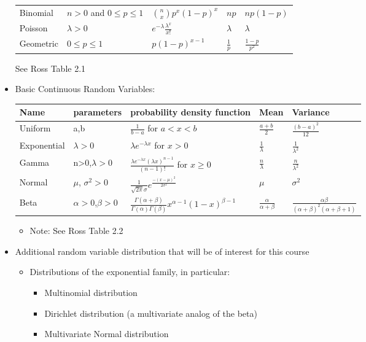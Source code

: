 \documentclass[10pt,containsverbatim,paralist]{article}
\begin{document}
\begin{itemize}
\begin{center}
\begin{tabular}{lllll}
\hline
Binomial & $n>0$ and $0\leq p\leq 1$ & $\binom{n}{x} p^x (1-p)^x$ & $np$ & $np(1-p)$\\
Poisson & $\lambda >0$ & $e^{-\lambda}\frac{\lambda^x}{x!}$ & $\lambda$ & $\lambda$\\
Geometric & $0\leq p\leq 1$ & $p(1-p)^{x-1}$ & $\frac{1}{p}$ & $\frac{1-p}{p^2}$\\
\hline
\end{tabular}
\end{center}
See Ross Table 2.1
\item Basic Continuous Random Variables:
\label{sec-1-1-4-3}
\begin{center}
\begin{tabular}{lllll}
\hline
Name & parameters & probability density function & Mean & Variance\\
\hline
Uniform & a,b & $\frac{1}{b-a}$ for $a<x<b$ & $\frac{a+b}{2}$ & $\frac{(b-a)^2}{12}$\\
Exponential & $\lambda>0$ & $\lambda e^{-\lambda x}$ for $x>0$ & $\frac{1}{\lambda}$ & $\frac{1}{\lambda^2}$\\
Gamma & n>0,$\lambda>0$ & $\frac{\lambda e^{-\lambda x}(\lambda x)^{n-1}}{(n-1)!}$ for $x\geq 0$ & $\frac{n}{\lambda}$ & $\frac{n}{\lambda^2}$\\
Normal & $\mu$, $\sigma^2>0$ & $\frac{1}{\sqrt{2\pi}\sigma}e^{\frac{-(x-\mu)^2}{2\sigma^2}}$ & $\mu$ & $\sigma^2$\\
Beta & $\alpha>0$,$\beta>0$ & $\frac{\Gamma(\alpha+\beta)}{\Gamma(\alpha)\Gamma(\beta)}x^{\alpha-1}(1-x)^{\beta-1}$ & $\frac{\alpha}{\alpha+\beta}$ & $\frac{\alpha \beta}{(\alpha+\beta)^2 (\alpha+\beta+1)}$\\
\hline
\end{tabular}
\end{center}
\begin{itemize}
\item Note: See Ross Table 2.2
\end{itemize}
\item Additional random variable distribution that will be of interest for this course
\label{sec-1-1-4-4}
\begin{itemize}
\item Distributions of the exponential family, in particular:
\begin{itemize}
\item Multinomial distribution
\item Dirichlet distribution (a multivariate analog of the beta)
\item Multivariate Normal distribution

\end{itemize}
\end{itemize}
\end{itemize}
\end{document}
